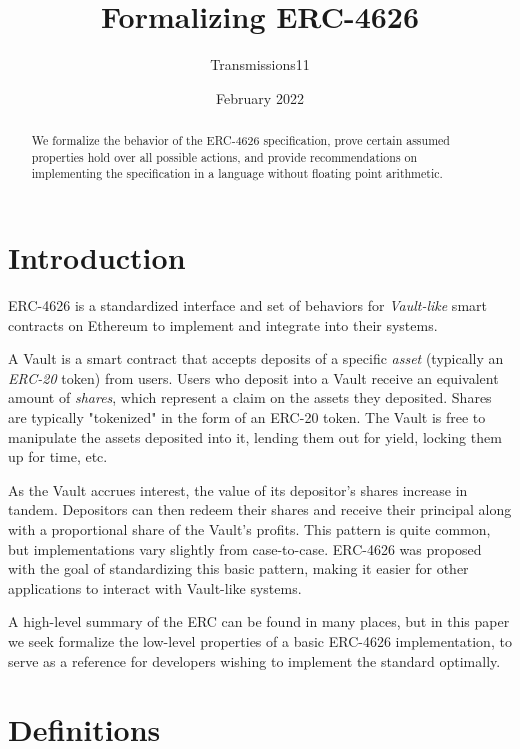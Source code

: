 \documentclass{article}
\title{\textbf{Formalizing ERC-4626}}
\author{Transmissions11}
\date{February 2022}
\begin{document}
\maketitle

\begin{abstract}

We formalize the behavior of the ERC-4626 specification, prove certain assumed properties hold over all possible actions, and provide recommendations on implementing the specification in a language without floating point arithmetic. 

\end{abstract}

\tableofcontents

\section{Introduction}

ERC-4626 is a standardized interface and set of behaviors for \emph{Vault-like} smart contracts on Ethereum to implement and integrate into their systems.

A Vault is a smart contract that accepts deposits of a specific \emph{asset} (typically an \emph{ERC-20} token) from users. Users who deposit into a Vault receive an equivalent amount of \emph{shares}, which represent a claim on the assets they deposited. Shares are typically "tokenized" in the form of an ERC-20 token. The Vault is free to manipulate the assets deposited into it, lending them out for yield, locking them up for time, etc. 

As the Vault accrues interest, the value of its depositor's shares increase in tandem. Depositors can then redeem their shares and receive their principal along with a proportional share of the Vault's profits. This pattern is quite common, but implementations vary slightly from case-to-case. ERC-4626 was proposed with the goal of standardizing this basic pattern, making it easier for other applications to interact with Vault-like systems.

A high-level summary of the ERC can be found in many places, but in this paper we seek formalize the low-level properties of a basic ERC-4626 implementation, to serve as a reference for developers wishing to implement the standard optimally.

\section{Definitions}
\end{document}
